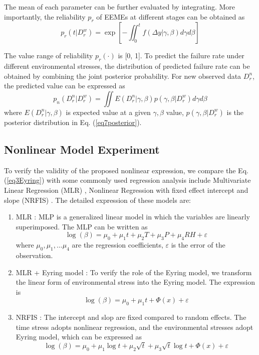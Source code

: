 \documentclass[journal,twoside,web]{ieeecolor}
\begin{document}
The mean of each parameter can be further evaluated by integrating. More importantly, the reliability $ p_r $ of EEMEs at different stages can be obtained as
\begin{equation}\label{eq10reliabil}
p_r(t|D_{r}^{w}) = \exp [-\iint_0^t f(\Delta{y} | \gamma, \beta) d\gamma d\beta ]
\end{equation}

The value range of reliability $ p_r(\cdot) $ is [0, 1]. To predict the failure rate under different environmental stresses, the distribution of predicted failure rate can be obtained by combining the joint posterior probability. For new observed data $ D_{r}^{n} $, the predicted value can be expressed as
\begin{equation}\label{eq11reliabil}
p_n(D_{r}^{n}|D_{r}^{w}) = \iint E(D_{r}^{n}|\gamma,\beta) p( \gamma, \beta | D_{r}^{w}) d\gamma d\beta
\end{equation}
where $ E(D_{r}^{n}|\gamma,\beta) $ is expected value at a given $ \gamma,\beta $ value, $ p( \gamma, \beta | D_{r}^{w}) $ is the posterior distribution in Eq. (\ref{eq7posterior}).



\subsection{Nonlinear Model Experiment}

To verify the validity of the proposed nonlinear expression, we compare the Eq. (\ref{eq3Eyring}) with some commonly used regression analysis include Multivariate Linear Regression (MLR) \cite{FUMO2015332}, Nonlinear Regression with fixed effect intercept and slope (NRFIS) \cite{GUO2015173}. The detailed expression of these models are:
\begin{enumerate}
	\item MLR \cite{FUMO2015332}: MLP is a generalized linear model in which the variables are linearly superimposed. The MLP can be written as
	\begin{equation}\label{eq3MLP}
	\log(\beta) = \mu_{0} + \mu_{1}t + \mu_{2}T+\mu_{3}P+\mu_{4}RH + \varepsilon
	\end{equation}
	where $ \mu_{0}, \mu_{1}, ... \mu_{4} $ are the regression coefficients, $ \varepsilon $ is the error of the observation.
	\item MLR + Eyring model \cite{FUMO2015332}: To verify the role of the Eyring model, we transform the linear form of environmental stress into the Eyring model. The expression is
	\begin{equation}\label{eq3MLPEyring}
	\log(\beta) = \mu_{0} + \mu_{1}t + \varPhi(x) + \varepsilon
	\end{equation}
	\item NRFIS \cite{GUO2015173}: The intercept and slop are fixed compared to random effects. The time stress adopts nonlinear regression, and the environmental stresses adopt Eyring model, which can be expressed as
	\begin{equation}\label{eq3NRFIS}
	\log(\beta) = \mu_{0} + \mu_{1}\log{t} + \mu_{2}\sqrt{t} + \mu_{3}\sqrt{t}\log{t} + \varPhi(x) + \varepsilon
	\end{equation}
\end{enumerate}
\end{document}
